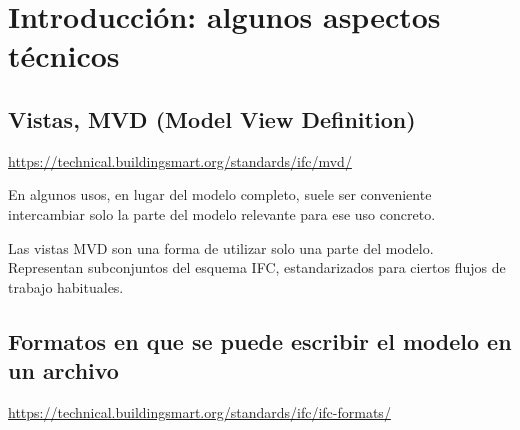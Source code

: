 \documentclass[spanish,12pt,a4paper,final,oneside]{book}
\begin{document}
\chapter{Introducción: algunos aspectos técnicos}

\section{Vistas, MVD (Model View Definition)}
\url{https://technical.buildingsmart.org/standards/ifc/mvd/}

En algunos usos, en lugar del modelo completo, suele ser conveniente intercambiar solo la parte del modelo relevante para ese uso concreto.

Las vistas MVD son una forma de utilizar solo una parte del modelo. Representan subconjuntos del esquema IFC, estandarizados para ciertos flujos de trabajo habituales.


\section{Formatos en que se puede escribir el modelo en un archivo}

\url{https://technical.buildingsmart.org/standards/ifc/ifc-formats/}
\end{document}
